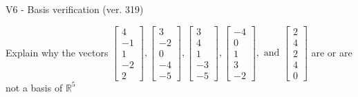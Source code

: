 \begin{exercise}
  \begin{exerciseTitle}V6 - Basis verification (ver. 319)\end{exerciseTitle}
  \begin{exerciseStatement}
    Explain why the vectors \(\left[\begin{array}{r}
4 \\
-1 \\
1 \\
-2 \\
2
\end{array}\right] , \left[\begin{array}{r}
3 \\
-2 \\
0 \\
-4 \\
-5
\end{array}\right] , \left[\begin{array}{r}
3 \\
4 \\
1 \\
-3 \\
-5
\end{array}\right] , \left[\begin{array}{r}
-4 \\
0 \\
1 \\
3 \\
-2
\end{array}\right] , \text{ and } \left[\begin{array}{r}
2 \\
4 \\
2 \\
4 \\
0
\end{array}\right]\) are or are not a basis of \(\mathbb{R}^5\)	



\end{exerciseStatement}
\end{exercise}
